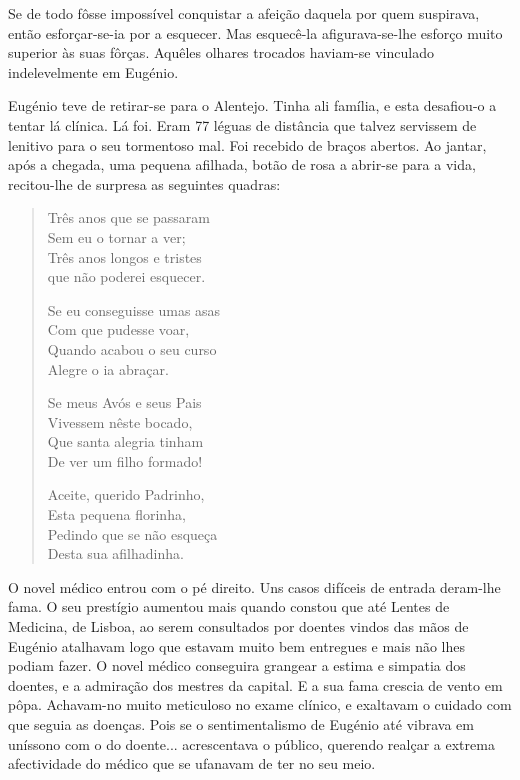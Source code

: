 \documentclass[9pt]{article}
\begin{document}

Se de todo fôsse impossível conquistar a afei\-ção daquela por quem
suspirava, então esforçar-se-ia por a esque\-cer. Mas esquecê-la afigurava-se-\-lhe esforço muito superior às suas fôrças. Aquêles o\-lhares trocados haviam-se vinculado indelevelmente em Eugé\-nio.

Eugé\-nio teve de retirar-se para o Alentejo. Tinha ali fa\-mí\-lia, e
esta desafiou-o a tentar lá clínica. Lá foi. Eram 77 léguas de distância que talvez servissem de lenitivo para o seu tormentoso mal.
Foi recebido de braços abertos. Ao jantar, após a chegada, uma pequena afi\-lhada, botão de rosa a abrir-se para a vida, recitou-\-lhe de surpresa as seguintes quadras:

\begin{quote}\small
Três anos que se passaram
\\
Sem eu o tornar a ver;
\\
Três anos longos e tristes
\\
que não poderei esque\-cer.

Se eu conseguisse umas asas
\\
Com que pudesse voar,
\\
Quando acabou o seu curso
\\
Alegre o ia abraçar.

Se meus Avós e seus Pais
\\
Vivessem nês\-te bocado,
\\
Que santa alegria tinham
\\
De ver um fi\-lho formado!

Aceite, querido Padrinho,
\\
Esta pequena florinha,
\\
Pedindo que se não esqueça
\\
Desta sua afi\-lhadinha.
\end{quote}

O novel médico entrou com o pé direito. Uns casos difíceis de
entrada deram-\-lhe fama. O seu prestígio aumentou mais quan\-do constou que até Lentes de Medicina, de Lisboa, ao serem
consultados por doentes vindos das mãos de Eugé\-nio ata\-lhavam logo que
estavam muito bem entregues e mais não lhes podiam fazer. O novel médico conseguira grangear a estima e simpatia dos doentes, e a admira\-ção dos mestres da capital. E a sua fama crescia de vento em pôpa.
Achavam-no muito meticuloso no exame clínico, e exaltavam o cuidado
com que seguia as doenças. Pois se o sentimentalismo de Eugé\-nio até
vibrava em uníssono com o do doente... acrescentava o público, querendo realçar a extrema afectividade do médico que se ufanavam de ter
no seu meio.
\end{document}

